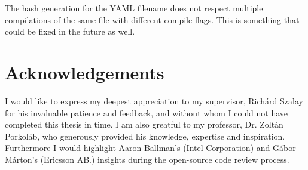 The hash generation for the YAML filename does not respect multiple compilations of the same file with different compile flags. This is something
that could be fixed in the future as well.

\section*{Acknowledgements}

I would like to express my deepest appreciation to my supervisor, Richárd Szalay for his invaluable patience and feedback, and without whom
I could not have completed this thesis in time. I am also greatful to my professor, Dr. Zoltán Porkoláb, who generously provided his knowledge,
expertise and inspiration. Furthermore I would highlight Aaron Ballman's (Intel Corporation) and Gábor Márton's (Ericsson AB.) insights during
the open-source code review process.